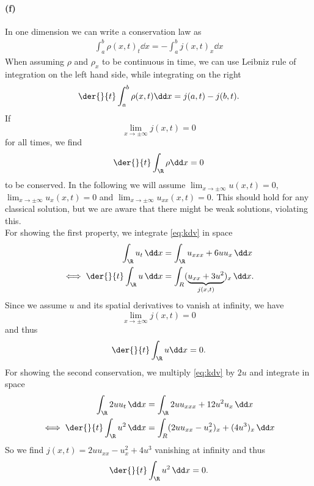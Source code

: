 \paragraph{(f)}
In one dimension we can write a conservation law as
\begin{align}
\int_a^b\rho(x,t)_t\dd x=-\int_a^b j(x,t)_x\dd x
\end{align}
When assuming $\rho$ and $\rho_x$ to be continuous in time, we can use Leibniz rule of integration on the left hand side, while integrating on the right
\begin{align}
\der{}{t}\int_a^b\rho(x,t) \dd x= j(a,t)-j(b,t).
\end{align}
If \[\lim_{x\to\pm\infty} j (x,t)= 0\] for all times, we find
\begin{align}
\der{}{t}\int_\R \rho \dd x = 0
\end{align}
to be conserved.
In the following we will assume $\lim_{x\to\pm\infty}u(x,t)=0$, $\lim_{x\to\pm\infty}u_x(x,t)=0$ and $\lim_{x\to\pm\infty}u_{xx}(x,t)=0$. This should hold for any classical solution, but we are aware that there might be weak solutions, violating this.\\
For showing the first property, we integrate \cref{eq:kdv} in space
\begin{align}
\int_\R u_t \,\dd x&= \int_\R u_{xxx} +6uu_x\,\dd x\\
\iff \der{}{t} \int_\R u \,\dd x & = \int_R (\underbrace{u_{xx} + 3 u^2}_{j(x,t)})_x\, \dd x.
\end{align} 
Since we assume $u$ and its spatial derivatives to vanish at infinity, we have \[\lim_{x\to\pm\infty} j (x,t)= 0\] and thus
\begin{align}
\der{}{t} \int_\R u \dd x = 0.
\end{align}
For showing the second conservation, we multiply \cref{eq:kdv} by $2u$ and integrate in space
\begin{align}
\int_\R2 uu_t\,\dd x & = \int_\R 2uu_{xxx} +12u^2u_x \, \dd x\\
\iff\der{}{t}\int_\R u^2\, \dd x&= \int_R (2uu_{xx}-u_x^2)_x + (4u^3)_x\,\dd x
\end{align}
So we find $j(x,t)=2uu_{xx}-u_x^2 + 4u^3$ vanishing at infinity and thus 
\begin{align}
\der{}{t}\int_\R u^2\, \dd x= 0.
\end{align}